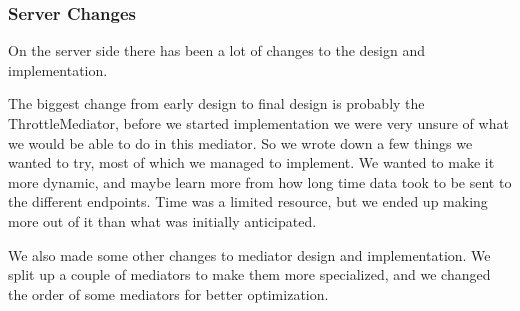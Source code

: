 \subsubsection{Server Changes}\label{Changes:Server}
    On the server side there has been a lot of changes to the design and implementation.
    
    The biggest change from early design to final design is probably the ThrottleMediator, before we started implementation we were very unsure of what we would be able to do in this mediator. So we wrote down a few things we wanted to try, most of which we managed to implement. We wanted to make it more dynamic, and maybe learn more from how long time data took to be sent to the different endpoints. Time was a limited resource, but we ended up making more out of it than what was initially anticipated.

    We also made some other changes to mediator design and implementation. We split up a couple of mediators to make them more specialized, and we changed the order of some mediators for better optimization.